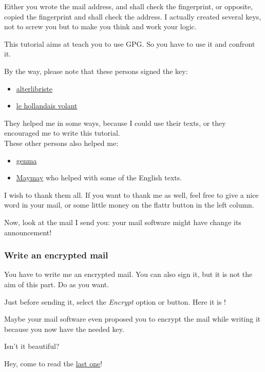 Either you wrote the mail address, and shall check the fingerprint, or
opposite, copied the fingerprint and shall check the address. I actually
created several keys, not to screw you but to make you think and work
your logic.

This tutorial aims at teach you to use GPG. So you have to use it and
confront it.

By the way, please note that these persons signed the key:

\begin{itemize}
\itemsep1pt\parskip0pt
\item
  \href{http://alterlibriste.free.fr/}{alterlibriste}
\item
  \href{http://lehollandaisvolant.net/}{le hollandais volant}
\end{itemize}

They helped me in some ways, because I could use their texts, or they
encouraged me to write this tutorial.\\These other persons also helped
me:

\begin{itemize}
\itemsep1pt\parskip0pt
\item
  \href{http://genma.free.fr/}{genma}
\item
  \href{https://maymay.net/}{Maymay} who helped with some of the English
  texts.
\end{itemize}

I wish to thank them all. If you want to thank me as well, feel free to
give a nice word in your mail, or some little money on the flattr button
in the left column.

Now, look at the mail I send you: your mail software might have change
its announcement!

\subsubsection{Write an encrypted mail}\label{write-an-encrypted-mail}

You have to write me an encrypted mail. You can also sign it, but it is
not the aim of this part. Do as you want.

Just before sending it, select the \emph{Encrypt} option or button. Here
it is !

Maybe your mail software even proposed you to encrypt the mail while
writing it because you now have the needed key.

Isn't it beautiful?

Hey, come to read the \href{\{filename\}7-sign-keys-en.md}{last one}!
